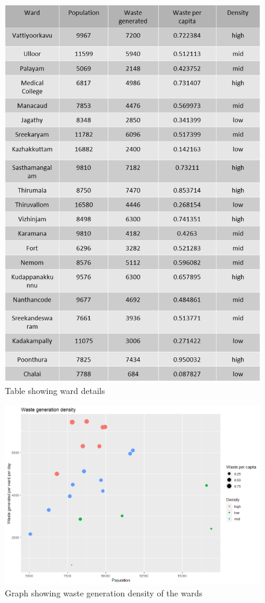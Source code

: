 \documentclass[12pt,a4paper]{report}
\begin{document}
\begin{figure}[H]
	\centering
	\includegraphics[width=1\linewidth]{table_waste_dens}
	\caption{Table showing ward details}
	\label{fig:tablewastedens}
\end{figure}

\begin{figure}[H]
	\centering
	\includegraphics[width=1\linewidth]{waste_gen_dens}
	\caption{Graph showing waste generation density of the wards}
	\label{fig:wastegendens}
\end{figure}
\end{document}
